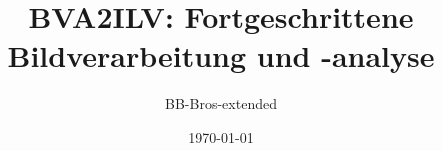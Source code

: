 \documentclass[11pt]{article}
\begin{document}



%
\begin{titlepage}
	\title{BVA2ILV: Fortgeschrittene Bildverarbeitung und -analyse} 
	\author{BB-Bros-extended} 
	\date{\today} 
	\maketitle
	\thispagestyle{empty}
	\newpage
\end{titlepage}

\tableofcontents
\listoffigures
\thispagestyle{empty}
\newpage







\end{document}
